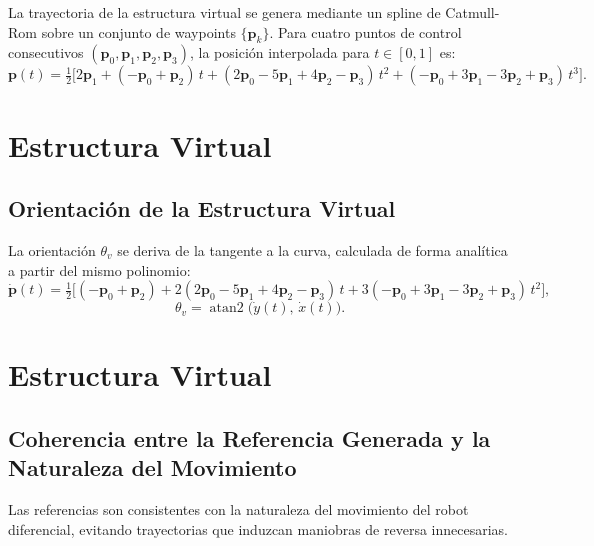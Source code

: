 La trayectoria de la estructura virtual se genera mediante un spline de Catmull-Rom sobre un conjunto de waypoints $\{\mathbf{p}_k\}$. Para cuatro puntos de control consecutivos $(\mathbf{p}_0, \mathbf{p}_1, \mathbf{p}_2, \mathbf{p}_3)$, la posición interpolada para $t \in [0,1]$ es:
\begin{equation*}
    \mathbf{p}(t) = \tfrac{1}{2}\Big[2\mathbf{p}_1 + (-\mathbf{p}_0+\mathbf{p}_2)\,t + (2\mathbf{p}_0-5\mathbf{p}_1+4\mathbf{p}_2-\mathbf{p}_3)\,t^2 + (-\mathbf{p}_0+3\mathbf{p}_1-3\mathbf{p}_2+\mathbf{p}_3)\,t^3\Big].
\end{equation*}



\section{Estructura Virtual}
\subsection{Orientación de la Estructura Virtual}

La orientación $\theta_v$ se deriva de la tangente a la curva, calculada de forma analítica a partir del mismo polinomio:
\begin{equation*}
    \dot{\mathbf{p}}(t) = \tfrac{1}{2}\Big[(-\mathbf{p}_0+\mathbf{p}_2) + 2(2\mathbf{p}_0-5\mathbf{p}_1+4\mathbf{p}_2-\mathbf{p}_3)\,t + 3(-\mathbf{p}_0+3\mathbf{p}_1-3\mathbf{p}_2+\mathbf{p}_3)\,t^2\Big],
\end{equation*}
\begin{equation*}
    \theta_v = \operatorname{atan2}\big(\dot{y}(t),\, \dot{x}(t)\big).
\end{equation*}














\section{Estructura Virtual}
\subsection{Coherencia entre la Referencia Generada y la Naturaleza del Movimiento}

Las referencias son consistentes con la naturaleza del movimiento del robot diferencial, evitando trayectorias que induzcan maniobras de reversa innecesarias.

